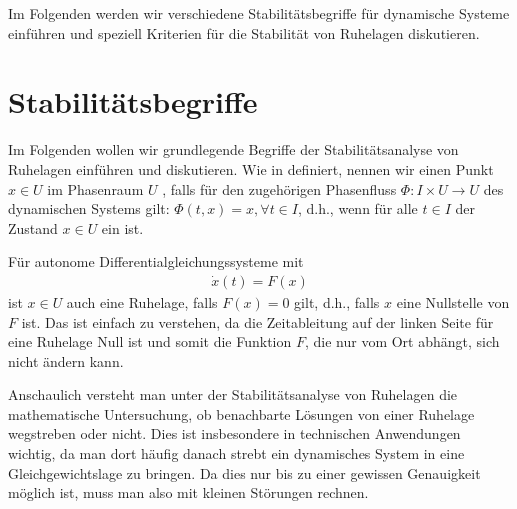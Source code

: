 \documentclass[letterpaper,10pt,english]{jupyterBook}
\begin{document}
\sphinxAtStartPar
Im Folgenden werden wir verschiedene Stabilitätsbegriffe für dynamische Systeme einführen und speziell Kriterien für die Stabilität von Ruhelagen diskutieren.


\section{Stabilitätsbegriffe}
\label{\detokenize{odestability/stabilitaetsbegriffe:stabilitatsbegriffe}}\label{\detokenize{odestability/stabilitaetsbegriffe::doc}}
\sphinxAtStartPar
Im Folgenden wollen wir grundlegende Begriffe der Stabilitätsanalyse von Ruhelagen einführen und diskutieren.
Wie in {\hyperref[\detokenize{ode/fluesse:s-fluesse}]{}} definiert, nennen wir einen Punkt \(x\in U\) im Phasenraum \(U\) , falls für den zugehörigen Phasenfluss \(\Phi \colon I \times U \rightarrow U\) des dynamischen Systems gilt: \(\Phi(t,x) = x, \forall t \in I\), d.h., wenn für alle \(t \in I\) der Zustand \(x \in U\) ein  ist.

\sphinxAtStartPar
Für autonome Differentialgleichungssysteme mit
\begin{equation*}
\begin{split}\dot{x}(t) = F(x)\end{split}
\end{equation*}
\sphinxAtStartPar
ist \(x \in U\) auch eine Ruhelage, falls \(F(x) = 0\) gilt, d.h., falls \(x\) eine Nullstelle von \(F\) ist.
Das ist einfach zu verstehen, da die Zeitableitung auf der linken Seite für eine Ruhelage Null ist und somit die Funktion \(F\), die nur vom Ort abhängt, sich nicht ändern kann.

\sphinxAtStartPar
Anschaulich versteht man unter der Stabilitätsanalyse von Ruhelagen die mathematische Untersuchung, ob benachbarte Lösungen von einer Ruhelage wegstreben oder nicht.
Dies ist insbesondere in technischen Anwendungen wichtig, da man dort häufig danach strebt ein dynamisches System in eine Gleichgewichtslage zu bringen.
Da dies nur bis zu einer gewissen Genauigkeit möglich ist, muss man also mit kleinen Störungen rechnen.
\end{document}
